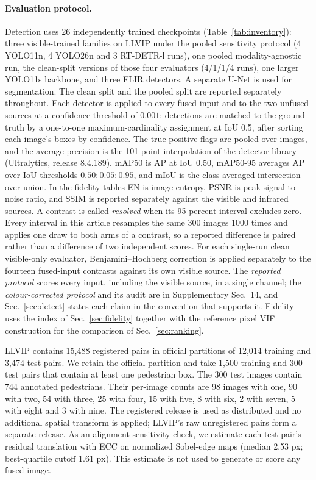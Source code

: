 \documentclass[10pt,a4paper]{article}
\begin{document}
\paragraph{Evaluation protocol.} Detection uses 26 independently trained checkpoints
(Table~\ref{tab:inventory}): three visible-trained families on LLVIP under the pooled
sensitivity protocol (4 YOLO11n, 4 YOLO26n and 3 RT-DETR-l runs), one pooled
modality-agnostic run, the clean-split versions of those four evaluators
(4/1/1/4 runs), one larger YOLO11s backbone, and three FLIR detectors. A separate U-Net
is used for segmentation. The clean split and the pooled split are reported separately
throughout.
Each detector is applied to every fused input and to the two unfused sources at a
confidence threshold of $0.001$; detections are matched to
the ground truth by a one-to-one maximum-cardinality assignment at IoU 0.5, after sorting
each image's boxes by confidence. The true-positive flags are pooled over images, and the
average precision is the 101-point interpolation of the detector library (Ultralytics,
release 8.4.189). mAP50 is AP at IoU 0.50, mAP50-95 averages AP over IoU thresholds
$0.50{:}0.05{:}0.95$, and mIoU is the class-averaged intersection-over-union. In the
fidelity tables EN is image entropy, PSNR is peak signal-to-noise ratio, and SSIM is
reported separately against the visible and infrared sources. A contrast is called
\emph{resolved} when its 95 percent interval excludes zero. Every interval in this article resamples the same 300 images
1000 times and applies one draw to both arms of a contrast, so a reported difference
is paired rather than a difference of two independent scores. For each single-run
clean visible-only evaluator, Benjamini--Hochberg correction is applied separately to
the fourteen fused-input contrasts against its own visible source. The
\emph{reported protocol} scores every input, including the visible source, in a single
channel; the \emph{colour-corrected protocol} and its audit are in
Supplementary Sec.~14, and Sec.~\ref{sec:detect} states each claim in the convention
that supports it. Fidelity uses the index of Sec.~\ref{sec:fidelity} together with the
reference pixel VIF construction for the comparison of Sec.~\ref{sec:ranking}.

LLVIP contains 15,488 registered pairs in official partitions of 12,014 training and
3,474 test pairs. We retain the official partition and take 1,500 training and 300 test
pairs that contain at least one pedestrian box. The 300 test images contain 744 annotated
pedestrians. Their per-image counts are 98 images with one, 90 with two, 54 with three,
25 with four, 15 with five, 8 with six, 2 with seven, 5 with eight and 3 with nine. The
registered release is used as distributed and no additional spatial transform is applied;
LLVIP's raw unregistered pairs form a separate release. As an alignment sensitivity check,
we estimate each test pair's residual translation with ECC on normalized Sobel-edge maps
(median 2.53 px; best-quartile cutoff 1.61 px). This estimate is not used to generate or
score any fused image.
\end{document}
